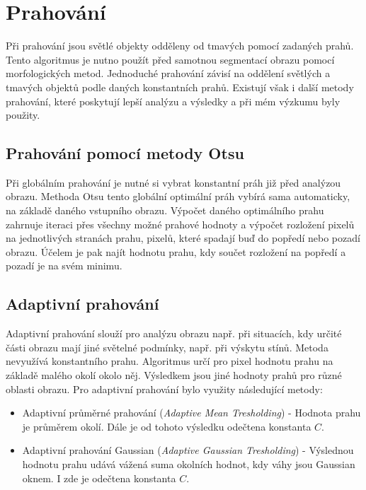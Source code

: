 \section{Prahování}
Při prahování jsou světlé objekty odděleny od tmavých pomocí zadaných prahů. Tento algoritmus je nutno použít před samotnou segmentací obrazu pomocí morfologických metod. Jednoduché prahování závisí na oddělení světlých a tmavých objektů podle daných konstantních prahů. Existují však i další metody prahování, které poskytují lepší analýzu a výsledky a při mém výzkumu byly použity.

\subsection{Prahování pomocí metody Otsu}
Při globálním prahování je nutné si vybrat konstantní práh již před analýzou obrazu. Methoda Otsu tento globální optimální práh vybírá sama automaticky, na základě daného vstupního obrazu. \cite{OpenCVTresholding}Výpočet daného optimálního prahu zahrnuje iteraci přes všechny možné prahové hodnoty a výpočet rozložení pixelů na jednotlivých stranách prahu, pixelů, které spadají buď do popředí nebo pozadí obrazu. Účelem je pak najít hodnotu prahu, kdy součet rozložení na popředí a pozadí je na svém minimu.\cite{LabBookPagesTresholding}

\subsection{Adaptivní prahování}
Adaptivní prahování slouží pro analýzu obrazu např. při situacích, kdy určité části obrazu mají jiné světelné podmínky, např. při výskytu stínů. Metoda nevyužívá konstantního prahu. Algoritmus určí pro pixel hodnotu prahu na základě malého okolí okolo něj. Výsledkem jsou jiné hodnoty prahů pro různé oblasti obrazu. Pro adaptivní prahování bylo využity následující metody:\cite{OpenCVTresholding}
\begin{itemize}
    \item Adaptivní průměrné prahování (\textit{Adaptive Mean Tresholding}) - Hodnota prahu je průměrem okolí. Dále je od tohoto výsledku odečtena konstanta $C$.
    \item Adaptivní prahování Gaussian (\textit{Adaptive Gaussian Tresholding}) - Výslednou hodnotu prahu udává vážená suma okolních hodnot, kdy váhy jsou Gaussian oknem. I zde je odečtena konstanta $C$.
\end{itemize}

